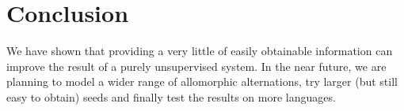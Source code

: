 \documentclass{itatnew}
\begin{document}
\section{Conclusion}

We have shown that providing a very little of easily obtainable information can improve the result of a purely unsupervised system. In the near future, we are planning to model a wider range of allomorphic alternations, try larger (but still easy to obtain) seeds and finally test the results on more languages.

%
%

{}
\end{document}
